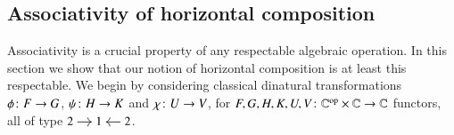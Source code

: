 \subsection{Associativity of horizontal composition}\label{section associativity horizontal composition}

Associativity is a crucial property of any respectable algebraic operation. In this section we show that our notion of horizontal composition is at least this respectable. 
We begin by considering classical dinatural transformations $\fst \colon \F \to \G$, $\psi \colon H \to K$ and $\chi \colon U \to V$, for $F,G,H,K,U,V \colon \mathbb C^{\text{op}} \times \mathbb C \to \mathbb C$ functors, all of type
$
\begin{tikzcd}[cramped,sep=small]
2 \ar[r] & 1 & \ar[l] 2
\end{tikzcd}
$.

